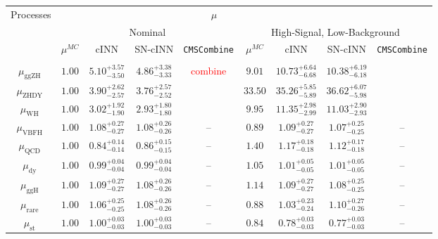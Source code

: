 \begin{table}[h!]
	\centering
	\begin{tabular}{ccccccccc}
		\multirow{3}{*}{Processes} & \multicolumn{7}{c}{$\mu$}\\
		&\multicolumn{4}{c}{Nominal}&\multicolumn{4}{c}{High-Signal, Low-Background} \\
		& $\mu^{MC}$ & cINN & SN-cINN & \texttt{CMSCombine} & $\mu^{MC}$ & cINN & SN-cINN & \texttt{CMSCombine} \\[0.1em]
		 \hline\\
		$\mu_\text{ggZH } $ & $1.00$ & $5.10^{+3.57}_{-3.50}$ & $4.86^{+3.38}_{-3.33}$ &  \textcolor{red}{combine} & $9.01 $ & $10.73^{+6.64}_{-6.68}$ & $10.38^{+6.19}_{-6.18}$ & \\[0.3em]
		$\mu_\text{ZHDY } $ & $1.00$ & $3.90^{+2.62}_{-2.57}$ & $3.76^{+2.57}_{-2.52}$ &                           & $33.50$ & $35.26^{+5.85}_{-5.89}$ & $36.62^{+6.07}_{-5.98}$ & \\[0.3em]
		$\mu_\text{WH   } $ & $1.00$ & $3.02^{+1.92}_{-1.90}$ & $2.93^{+1.80}_{-1.80}$ &                           & $9.95 $ & $11.35^{+2.98}_{-2.99}$ & $11.03^{+2.90}_{-2.93}$ & \\[0.3em]
		$\mu_\text{VBFH } $ & $1.00$ & $1.08^{+0.27}_{-0.27}$ & $1.08^{+0.26}_{-0.26}$ & --                        & $0.89 $ & $1.09^{+0.27}_{-0.27}$  & $1.07^{+0.25}_{-0.25}$  & -- \\[0.3em]
		$\mu_\text{QCD  } $ & $1.00$ & $0.84^{+0.14}_{-0.14}$ & $0.86^{+0.15}_{-0.15}$ & --                        & $1.40 $ & $1.17^{+0.18}_{-0.18}$  & $1.12^{+0.17}_{-0.18}$  & -- \\[0.3em]
		$\mu_\text{dy   } $ & $1.00$ & $0.99^{+0.04}_{-0.04}$ & $0.99^{+0.04}_{-0.04}$ & --                        & $1.05 $ & $1.01^{+0.05}_{-0.05}$  & $1.01^{+0.05}_{-0.05}$  & -- \\[0.3em]
		$\mu_\text{ggH  } $ & $1.00$ & $1.09^{+0.27}_{-0.27}$ & $1.08^{+0.26}_{-0.26}$ & --                        & $1.14 $ & $1.09^{+0.27}_{-0.27}$  & $1.08^{+0.25}_{-0.25}$  & -- \\[0.3em]
		$\mu_\text{rare } $ & $1.00$ & $1.06^{+0.25}_{-0.25}$ & $1.08^{+0.26}_{-0.26}$ & --                        & $0.88 $ & $1.03^{+0.23}_{-0.24}$  & $1.10^{+0.27}_{-0.26}$  & -- \\[0.3em]
		$\mu_\text{st   } $ & $1.00$ & $1.00^{+0.03}_{-0.03}$ & $1.00^{+0.03}_{-0.03}$ & --                        & $0.84 $ & $0.78^{+0.03}_{-0.03}$  & $0.77^{+0.03}_{-0.03}$  & -- \\[0.3em]

\end{tabular}
\end{table}

